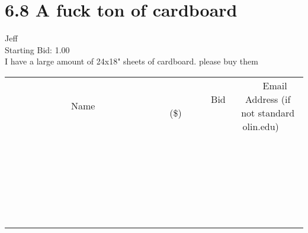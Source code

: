 \documentclass[11pt]{article}
\begin{document}
					\section*{6.8 A fuck ton of cardboard}
					Jeff \\
					Starting Bid: 1.00 \\
					I have a large amount of 24x18" sheets of cardboard. please buy them \\
					[6ex]
					\begin{tabular}{c c c}
						~~~~~~~~~~~~~Name~~~~~~~~~~~~~ & ~~~~~~~~~Bid (\$)~~~~~~~~~ & ~~~Email Address (if not standard olin.edu)~~~ \\
				
 & & \\
\hline
 & & \\
\hline
 & & \\
\hline
 & & \\
\hline
 & & \\
\hline
 & & \\
\hline
 & & \\
\hline
 & & \\
\hline
 & & \\
\hline
 & & \\
\hline
 & & \\
\hline
 & & \\
\hline
 & & \\
\hline
 & & \\
\hline
 & & \\
\hline
 & & \\
\hline
 & & \\
\hline
 & & \\
\hline
 & & \\
\hline
 & & \\
\hline
 & & \\
\hline
 & & \\
\hline
 & & \\
\hline
 & & \\
\hline
 & & \\
\hline
 & & \\
\hline
					\end{tabular}
					\clearpage
				
\end{document}
